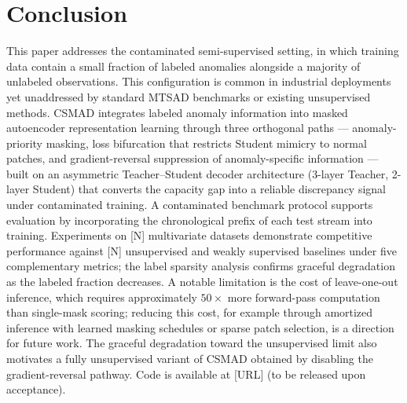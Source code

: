 
\section{Conclusion}
\label{sec:conclusion}

This paper addresses the contaminated semi-supervised setting, in which training data contain a
small fraction of labeled anomalies alongside a majority of unlabeled observations.
This configuration is common in industrial deployments yet unaddressed by standard MTSAD
benchmarks or existing unsupervised methods.
CSMAD integrates labeled anomaly information into masked autoencoder representation learning
through three orthogonal paths --- anomaly-priority masking, loss bifurcation that restricts
Student mimicry to normal patches, and gradient-reversal suppression of anomaly-specific
information --- built on an asymmetric Teacher--Student decoder architecture (3-layer Teacher,
2-layer Student) that converts the capacity gap into a reliable discrepancy signal under
contaminated training.
A contaminated benchmark protocol supports evaluation by incorporating the chronological prefix
of each test stream into training.
Experiments on [N] multivariate datasets demonstrate competitive performance against [N]
unsupervised and weakly supervised baselines under five complementary metrics; the label
sparsity analysis confirms graceful degradation as the labeled fraction decreases.
A notable limitation is the cost of leave-one-out inference, which requires approximately
$50{\times}$ more forward-pass computation than single-mask scoring; reducing this cost, for
example through amortized inference with learned masking schedules or sparse patch selection,
is a direction for future work.
The graceful degradation toward the unsupervised limit also motivates a fully unsupervised
variant of CSMAD obtained by disabling the gradient-reversal pathway.
Code is available at [URL] (to be released upon acceptance).
